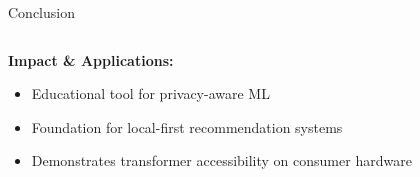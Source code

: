 \begin{frame}{Conclusion}
\begin{columns}[T]
\begin{column}{0.50\textwidth}
    \vspace{0.4cm}
    \textbf{Impact \& Applications:}
    \begin{itemize}
      \item Educational tool for privacy-aware ML
      \item Foundation for local-first recommendation systems
      \item Demonstrates transformer accessibility on consumer hardware
    \end{itemize}
  \end{column}
\end{columns}

\end{frame}